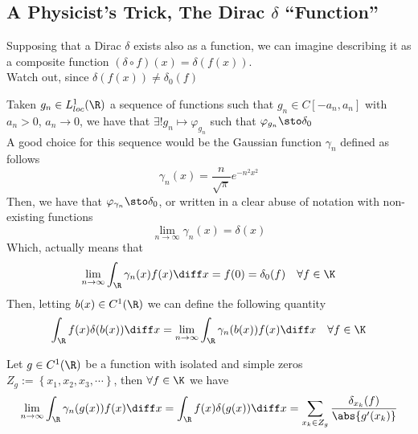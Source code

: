 \documentclass[../mmf.tex]{subfiles}
\begin{document}
\subsection{A Physicist's Trick, The Dirac $\delta$ ``Function''}
\begin{dfn}
	Supposing that a Dirac $\delta$ exists also as a function, we can imagine describing it as a composite function $(\delta\circ f)(x)=\delta(f(x))$.\\
	Watch out, since $\delta(f(x))\ne\delta_0(f)$
\end{dfn}
\begin{dfn}
	Taken $g_n\in L^1_{loc}(\R)$ a sequence of functions such that $g_n\in C[-a_n,a_n]$ with $a_n>0$, $a_n\to0$, we have that $\exists!g_n\mapsto\varphi_{g_n}$ such that $\varphi_{g_n}\sto\delta_0$\\
	A good choice for this sequence would be the Gaussian function $\gamma_n$ defined as follows
	\begin{equation}
		\gamma_n(x)=\frac{n}{\sqrt{\pi}}e^{-n^2x^2}
		\label{eq:gaussianfunc}
	\end{equation}
	Then, we have that $\varphi_{\gamma_n}\sto\delta_0$, or written in a clear abuse of notation with non-existing functions
	\begin{equation*}
		\lim_{n\to\infty}\gamma_n(x)=\delta(x)
	\end{equation*}
	Which, actually means that
	\begin{equation*}
		\lim_{n\to\infty}\int_{\R}^{}\gamma_n(x)f(x)\diff x=f(0)=\delta_0(f)\quad\forall f\in\K
	\end{equation*}
	Then, letting $b(x)\in C^1(\R)$ we can define the following quantity
	\begin{equation*}
		\int_{\R}^{}f(x)\delta(b(x))\diff x=\lim_{n\to\infty}\int_{\R}^{}\gamma_n(b(x))f(x)\diff x\quad\forall f\in\K
	\end{equation*}
\end{dfn}
\begin{thm}
	Let $g\in C^1(\R)$ be a function with isolated and simple zeros $Z_g:=\left\{ x_1,x_2,x_3,\cdots \right\}$, then $\forall f\in\K$ we have
	\begin{equation}
		\lim_{n\to\infty}\int_{\R}^{}\gamma_n(g(x))f(x)\diff x=\int_{\R}^{}f(x)\delta(g(x))\diff x=\sum_{x_k\in Z_g}\frac{\delta_{x_k}(f)}{\abs{g'(x_k)}}
		\label{eq:compdelta}
	\end{equation}
\end{thm}
\end{document}
